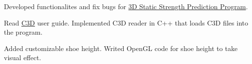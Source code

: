 \UM
{}

Developed functionalites and fix bugs for \href{https://c4e.engin.umich.edu/tools-services/3dsspp-software/}{3D Static Strength Prediction Program}.

\begin{miniItemize}
    \item Read \href{https://www.c3d.org/}{C3D} user guide. Implemented C3D reader in C++ that loads C3D files into the program.
    \item Added customizable shoe height. Writed OpenGL code for shoe height to take visual effect.
\end{miniItemize}
